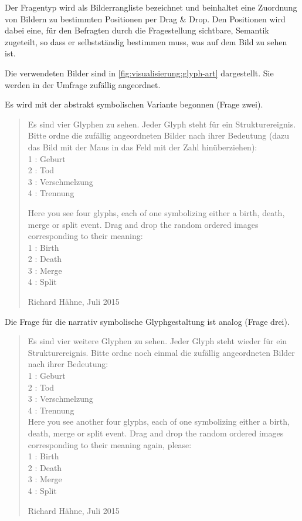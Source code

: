 Der Fragentyp wird als Bilderrangliste bezeichnet und beinhaltet eine Zuordnung von Bildern zu bestimmten Positionen per Drag \& Drop. Den Positionen wird dabei eine, für den Befragten durch die Fragestellung sichtbare, Semantik zugeteilt, so dass er selbstständig bestimmen muss, was auf dem Bild zu sehen ist.

Die verwendeten Bilder sind in \autoref{fig:visualisierung:glyph-art} dargestellt. Sie werden in der Umfrage zufällig angeordnet.

Es wird mit der abstrakt symbolischen Variante begonnen (Frage zwei).

\blockquote[Richard Hähne, Juli 2015]{
	Es sind vier Glyphen zu sehen. Jeder Glyph steht für ein Strukturereignis. Bitte ordne die zufällig angeordneten Bilder nach ihrer Bedeutung (dazu das Bild mit der Maus in das Feld mit der Zahl hinüberziehen):\\
	1 : Geburt\\
	2 : Tod\\
	3 : Verschmelzung\\
	4 : Trennung
	
	Here you see four glyphs, each of one symbolizing either a birth, death, merge or split event. Drag and drop the random ordered images corresponding to their meaning:\\
	1 : Birth\\
	2 : Death\\
	3 : Merge\\
	4 : Split
	
}

Die Frage für die narrativ symbolische Glyphgestaltung ist analog (Frage drei).
\blockquote[Richard Hähne, Juli 2015]{
	Es sind vier weitere Glyphen zu sehen. Jeder Glyph steht wieder für ein Strukturereignis. Bitte ordne noch einmal die zufällig angeordneten Bilder nach ihrer Bedeutung:\\
	1 : Geburt\\
	2 : Tod\\
	3 : Verschmelzung\\
	4 : Trennung\\
	
	Here you see another four glyphs, each of one symbolizing either a birth, death, merge or split event. Drag and drop the random ordered images corresponding to their meaning again, please:\\
	1 : Birth\\
	2 : Death\\
	3 : Merge\\
	4 : Split
	
}


